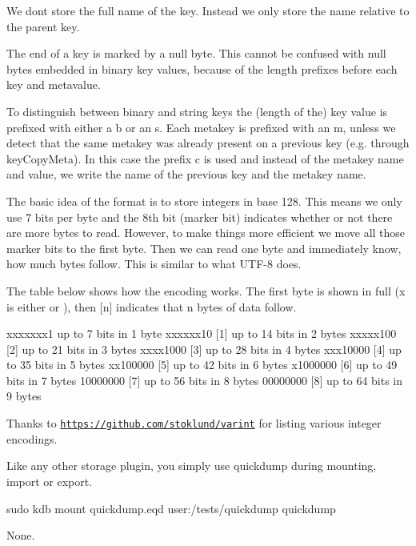 We don\textquotesingle{}t store the full name of the key. Instead we only store the name relative to the parent key.

The end of a key is marked by a null byte. This cannot be confused with null bytes embedded in binary key values, because of the length prefixes before each key and metavalue.

To distinguish between binary and string keys the (length of the) key value is prefixed with either a {\ttfamily b} or an {\ttfamily s}. Each metakey is prefixed with an {\ttfamily m}, unless we detect that the same metakey was already present on a previous key (e.\+g. through {\ttfamily key\+Copy\+Meta}). In this case the prefix {\ttfamily c} is used and instead of the metakey name and value, we write the name of the previous key and the metakey name.

The basic idea of the format is to store integers in base 128. This means we only use 7 bits per byte and the 8th bit (marker bit) indicates whether or not there are more bytes to read. However, to make things more efficient we move all those marker bits to the first byte. Then we can read one byte and immediately know, how much bytes follow. This is similar to what U\+T\+F-\/8 does.

The table below shows how the encoding works. The first byte is shown in full ({\ttfamily x} is either {} or {}), then {\ttfamily \mbox{[}n\mbox{]}} indicates that {\ttfamily n} bytes of data follow.


\begin{DoxyCode}
xxxxxxx1     up to  7 bits in 1 byte
xxxxxx10 [1] up to 14 bits in 2 bytes
xxxxx100 [2] up to 21 bits in 3 bytes
xxxx1000 [3] up to 28 bits in 4 bytes
xxx10000 [4] up to 35 bits in 5 bytes
xx100000 [5] up to 42 bits in 6 bytes
x1000000 [6] up to 49 bits in 7 bytes
10000000 [7] up to 56 bits in 8 bytes
00000000 [8] up to 64 bits in 9 bytes
\end{DoxyCode}


Thanks to \href{https://github.com/stoklund/varint}{\tt https\+://github.\+com/stoklund/varint} for listing various integer encodings.

Like any other storage plugin, you simply use {\ttfamily quickdump} during mounting, import or export.


\begin{DoxyCode}
sudo kdb mount quickdump.eqd user:/tests/quickdump quickdump
\end{DoxyCode}


None.


